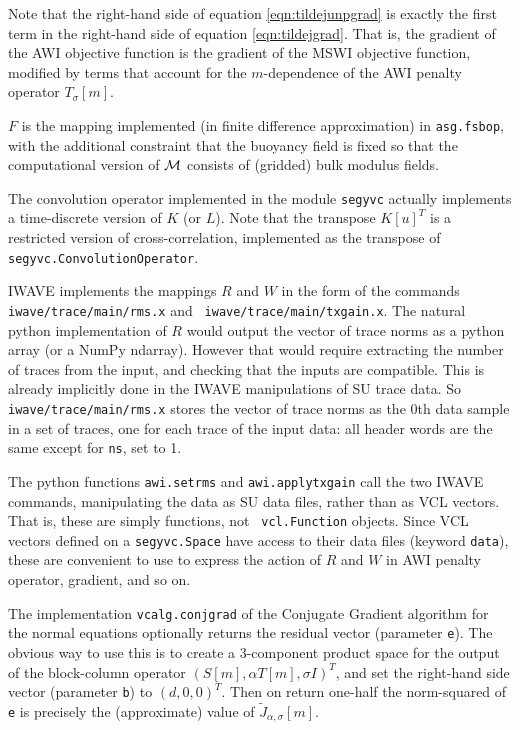 Note that the right-hand side of equation \ref{eqn:tildejunpgrad} is
exactly the first term in the right-hand side of equation
\ref{eqn:tildejgrad}. That is, the gradient of the AWI objective
function is the gradient of the MSWI objective function, modified by
terms that account for the $m$-dependence of the AWI penalty operator $T_{\sigma}[m]$.

 $F$ is the mapping implemented (in finite difference approximation) in {\tt asg.fsbop}, with the additional constraint that the buoyancy field is fixed so that the computational version of ${\cal M}$ consists of (gridded) bulk modulus fields.

 The convolution operator implemented in the module {\tt segyvc}
actually implements a time-discrete version of $K$ (or $L$). Note that
the transpose $K[u]^T$ is a restricted version of cross-correlation,
implemented as the transpose of {\tt segyvc.ConvolutionOperator}.

 IWAVE implements the mappings $R$ and $W$ in the form of
the commands \\{\tt iwave/trace/main/rms.x} and {\tt
  iwave/trace/main/txgain.x}. The natural python implementation of $R$
would output the vector of trace norms as a python array (or a NumPy
ndarray). However that would require extracting the number of traces
from the input, and checking that the inputs are compatible. This is
already implicitly done in the IWAVE manipulations of SU trace
data. So {\tt iwave/trace/main/rms.x} stores the vector of trace norms
as the 0th data sample in a set of traces, one for each trace of the
input data: all header words are the same except for {\tt ns}, set to 1.

 The python functions {\tt awi.setrms} and {\tt awi.applytxgain} call
the two IWAVE commands, manipulating the data as SU data files, rather
than as VCL vectors. That is, these are simply functions, not {\tt
  vcl.Function} objects. Since VCL vectors defined on a {\tt segyvc.Space}
have access to their data files (keyword {\tt data}), these are
convenient to use to express the action of $R$ and $W$ in AWI penalty operator,
gradient, and so on.

 The implementation {\tt vcalg.conjgrad} of the Conjugate Gradient algorithm for the normal equations optionally returns the residual vector (parameter {\tt e}). The obvious way to use this is to create a 3-component product space for the output of the block-column operator $(S[m],\alpha T[m], \sigma I)^T$, and set the right-hand side vector (parameter {\tt b})
to $(d,0,0)^T$. Then on return one-half the norm-squared of {\tt e} is
precisely the (approximate) value of $\tilde{J}_{\alpha,\sigma}[m]$.

